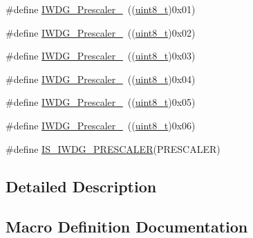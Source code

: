 \begin{DoxyCompactItemize}
\item 
\#define \hyperlink{group___i_w_d_g__prescaler_ga59763b9a127c67adf5d11474188996a1}{I\+W\+D\+G\+\_\+\+Prescaler\+\_}~((\hyperlink{_p_e___types_8h_aba7bc1797add20fe3efdf37ced1182c5}{uint8\+\_\+t})0x01)
\item 
\#define \hyperlink{group___i_w_d_g__prescaler_gafa81d30511ff5ec74bb38ed71f5bb66e}{I\+W\+D\+G\+\_\+\+Prescaler\+\_}~((\hyperlink{_p_e___types_8h_aba7bc1797add20fe3efdf37ced1182c5}{uint8\+\_\+t})0x02)
\item 
\#define \hyperlink{group___i_w_d_g__prescaler_gaa8b091b6e4102513b1e3a1c4eb6756ba}{I\+W\+D\+G\+\_\+\+Prescaler\+\_}~((\hyperlink{_p_e___types_8h_aba7bc1797add20fe3efdf37ced1182c5}{uint8\+\_\+t})0x03)
\item 
\#define \hyperlink{group___i_w_d_g__prescaler_ga7ea813c73ae0acb40acb60e7d3956910}{I\+W\+D\+G\+\_\+\+Prescaler\+\_}~((\hyperlink{_p_e___types_8h_aba7bc1797add20fe3efdf37ced1182c5}{uint8\+\_\+t})0x04)
\item 
\#define \hyperlink{group___i_w_d_g__prescaler_gaea6bf96c2fd5a6f3b9574e7898096641}{I\+W\+D\+G\+\_\+\+Prescaler\+\_}~((\hyperlink{_p_e___types_8h_aba7bc1797add20fe3efdf37ced1182c5}{uint8\+\_\+t})0x05)
\item 
\#define \hyperlink{group___i_w_d_g__prescaler_ga7d6e918748185639049644c970db2b43}{I\+W\+D\+G\+\_\+\+Prescaler\+\_}~((\hyperlink{_p_e___types_8h_aba7bc1797add20fe3efdf37ced1182c5}{uint8\+\_\+t})0x06)
\item 
\#define \hyperlink{group___i_w_d_g__prescaler_gab1e0695c1a22840d5be7c7fad283f4ba}{I\+S\+\_\+\+I\+W\+D\+G\+\_\+\+P\+R\+E\+S\+C\+A\+L\+ER}(P\+R\+E\+S\+C\+A\+L\+ER)
\end{DoxyCompactItemize}


\subsection{Detailed Description}


\subsection{Macro Definition Documentation}
